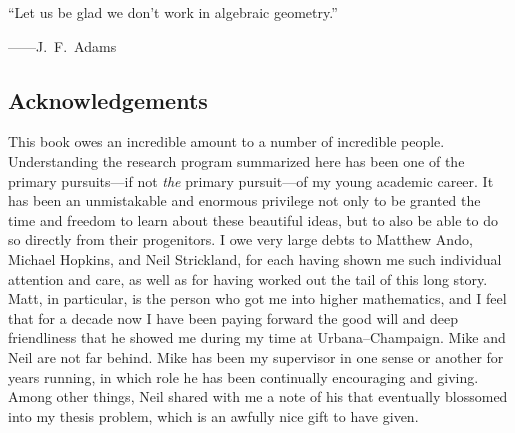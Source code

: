 
% 

\cleardoublepage

\vspace*{\fill}

\begin{center}
``Let us be glad we don't work in algebraic geometry.''

\hspace{6.3em} ------J.\ F.\ Adams~\cite[Section 2.1]{AdamsInfiniteLoopSpaces}
\end{center}

\vspace*{\fill}

\cleardoublepage



\cleardoublepage

\subsection*{Acknowledgements}


This book owes an incredible amount to a number of incredible people.  Understanding the research program summarized here has been one of the primary pursuits---if not \emph{the} primary pursuit---of my young academic career.  It has been an unmistakable and enormous privilege not only to be granted the time and freedom to learn about these beautiful ideas, but to also be able to do so directly from their progenitors.  I owe very large debts to Matthew Ando, Michael Hopkins, and Neil Strickland, for each having shown me such individual attention and care, as well as for having worked out the tail of this long story.  Matt, in particular, is the person who got me into higher mathematics, and I feel that for a decade now I have been paying forward the good will and deep friendliness that he showed me during my time at Urbana--Champaign.  Mike and Neil are not far behind.  Mike has been my supervisor in one sense or another for years running, in which role he has been continually encouraging and giving.  Among other things, Neil shared with me a note of his that eventually blossomed into my thesis problem, which is an awfully nice gift to have given.

